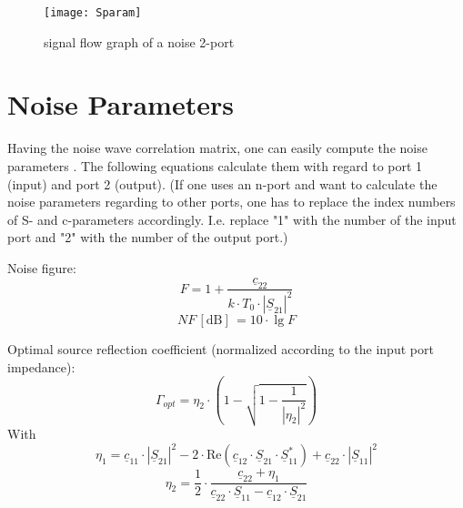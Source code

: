 \documentclass[10pt]{report}
\begin{document}
\begin{figure}[ht]
\begin{center}
\texttt{[image: Sparam]}
\end{center}
\caption{signal flow graph of a noise 2-port}
\label{fig:Sparam}
\end{figure}
\FloatBarrier


\section{Noise Parameters}

Having the noise wave correlation matrix, one can easily compute the
noise parameters \cite{Wedge}.  The following equations calculate them
with regard to port 1 (input) and port 2 (output).  (If one uses an
n-port and want to calculate the noise parameters regarding to other
ports, one has to replace the index numbers of S- and c-parameters
accordingly.  I.e. replace "1" with the number of the input port and
"2" with the number of the output port.)

\addvspace{12pt}

Noise figure:
\begin{equation}
F = 1 + \frac{\underline{c}_{22}}{k\cdot T_0\cdot |\underline{S}_{21}|^2}
\label{eqn:nparamF}
\end{equation}
\begin{equation}
NF\,[\text{dB}]\, = 10\cdot\lg F
\end{equation}

\addvspace{12pt}

Optimal source reflection coefficient (normalized according to the input
port impedance):
\begin{equation}
\Gamma_{opt} = \eta_2\cdot\left( 1-\sqrt{1-\frac{1}{|\eta_2|^2}} \right)
\end{equation}
With
\begin{equation}
\eta_1 = \underline{c}_{11}\cdot |\underline{S}_{21}|^2
       - 2\cdot \text{Re}\left(\underline{c}_{12}\cdot\underline{S}_{21}\cdot\underline{S}_{11}^*\right)
       + \underline{c}_{22}\cdot|\underline{S}_{11}|^2
\end{equation}
\begin{equation}
\eta_2 = \frac{1}{2}\cdot\frac{\underline{c}_{22} + \eta_1}
              {\underline{c}_{22}\cdot\underline{S}_{11} - \underline{c}_{12}\cdot\underline{S}_{21}}
\end{equation}

\addvspace{12pt}
\end{document}
